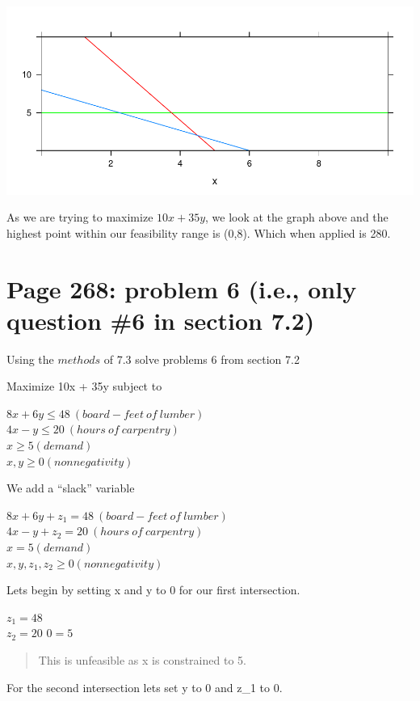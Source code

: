\documentclass[]{article}
\begin{document}
\includegraphics{Christophe_Hunt_hw6_files/figure-latex/unnamed-chunk-3-1.pdf}

As we are trying to maximize \(10x + 35y\), we look at the graph above
and the highest point within our feasibility range is (0,8). Which when
applied is 280.

\newpage

\section{Page 268: problem 6 (i.e., only question \#6 in section
7.2)}\label{page-268-problem-6-i.e.-only-question-6-in-section-7.2}

Using the \(methods\) of 7.3 solve problems 6 from section 7.2

Maximize 10x + 35y subject to

\(8x + 6y \leq 48 ~(board-feet~of~lumber)\)\\
\(4x - y \leq 20 ~ (hours~of~carpentry)\)\\
\(x \geq 5 (demand)\)\\
\(x,y \geq 0 (nonnegativity)\)

We add a ``slack'' variable

\(8x + 6y + z_1 = 48 ~(board-feet~of~lumber)\)\\
\(4x - y + z_2 = 20 ~ (hours~of~carpentry)\)\\
\(x = 5 (demand)\)\\
\(x,y, z_1, z_2 \geq 0 (nonnegativity)\)

Lets begin by setting x and y to 0 for our first intersection.

\(z_1 = 48\)\\
\(z_2 = 20\) \(0 = 5\)

\begin{quote}
This is unfeasible as x is constrained to 5.
\end{quote}

For the second intersection lets set y to 0 and z\_1 to 0.
\end{document}

